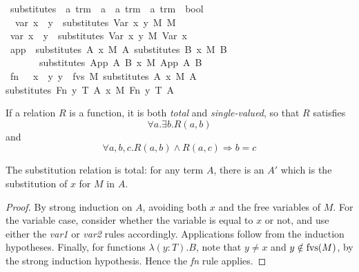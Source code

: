 \begin{implementation}
\isamarkupfalse%
\ substitutes\ {\isacharcolon}{\isacharcolon}\ {\isachardoublequoteopen}{\isacharprime}a\ trm\ {\isasymRightarrow}\ {\isacharprime}a\ {\isasymRightarrow}\ {\isacharprime}a\ trm\ {\isasymRightarrow}\ {\isacharprime}a\ trm\ {\isasymRightarrow}\ bool{\isachardoublequoteclose}\ \isanewline
\ \ var{}{\isacharcolon}\ {\isachardoublequoteopen}x\ {\isacharequal}\ y\ {\isasymLongrightarrow}\ substitutes\ {\isacharparenleft}Var\ x{\isacharparenright}\ y\ M\ M{\isachardoublequoteclose}\isanewline
{\isacharbar}\ var{}{\isacharcolon}\ {\isachardoublequoteopen}x\ {\isasymnoteq}\ y\ {\isasymLongrightarrow}\ substitutes\ {\isacharparenleft}Var\ x{\isacharparenright}\ y\ M\ {\isacharparenleft}Var\ x{\isacharparenright}{\isachardoublequoteclose}\isanewline
{\isacharbar}\ app{\isacharcolon}\ \ {\isachardoublequoteopen}{\isasymlbrakk}substitutes\ A\ x\ M\ A{\isacharprime}{\isacharsemicolon}\ substitutes\ B\ x\ M\ B{\isacharprime}{\isasymrbrakk}\isanewline
\ \ \ \ \ \ {\isasymLongrightarrow}\ substitutes\ {\isacharparenleft}App\ A\ B{\isacharparenright}\ x\ M\ {\isacharparenleft}App\ A{\isacharprime}\ B{\isacharprime}{\isacharparenright}{\isachardoublequoteclose}\isanewline
{\isacharbar}\ fn{\isacharcolon}\ \ \ {\isachardoublequoteopen}{\isasymlbrakk}x\ {\isasymnoteq}\ y{\isacharsemicolon}\ y\ {\isasymnotin}\ fvs\ M{\isacharsemicolon}\ substitutes\ A\ x\ M\ A{\isacharprime}{\isasymrbrakk}\isanewline
\ \ \ \ \ \ {\isasymLongrightarrow} substitutes\ {\isacharparenleft}Fn\ y\ T\ A{\isacharparenright}\ x\ M\ {\isacharparenleft}Fn\ y\ T\ A{\isacharprime}{\isacharparenright}{\isachardoublequoteclose}
\end{implementation}

If a relation \(R\) is a function, it is both \emph{total} and \emph{single-valued}, so that \(R\) satisfies
\[
\forall a. \exists b. R(a, b)
\]
and
\[
\forall a, b, c. R(a, b) \wedge R(a, c) \Longrightarrow b = c
\]

\begin{lemma}
\label{lemma:substitution-total}
The substitution relation is total: for any term \(A\), there is an \(A'\) which is the substitution of \(x\) for \(M\) in \(A\).
\end{lemma}
\begin{proof}
By strong induction on \(A\), avoiding both \(x\) and the free variables of \(M\).
For the variable case, consider whether the variable is equal to \(x\) or not, and use either the \emph{var1} or \emph{var2} rules accordingly.
Applications follow from the induction hypotheses.
Finally, for functions \(\lambda (y:T). B\), note that \(y \neq x\) and \(y \notin \mathrm{fvs}(M)\), by the strong induction hypothesis.
Hence the \emph{fn} rule applies.
\end{proof}

